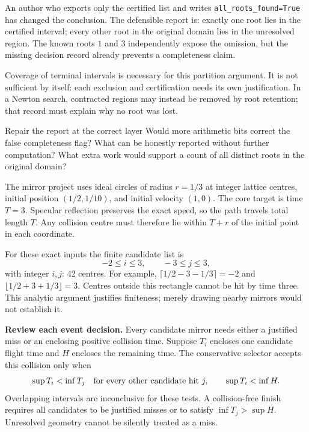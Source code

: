 An author who exports only the certified list and writes
\texttt{all\_roots\_found=True} has changed the conclusion. The defensible
report is: exactly one root lies in the certified interval; every other root
in the original domain lies in the unresolved region. The known roots $1$
and $3$ independently expose the omission, but the missing decision record
already prevents a completeness claim.

Coverage of terminal intervals is necessary for this partition argument.
It is not sufficient by itself: each exclusion and certification needs its
own justification. In a Newton search, contracted regions may instead be
removed by root retention; that record must explain why no root was lost.

\begin{question}{Repair the report at the correct layer}
Would more arithmetic bits correct the false completeness flag? What can
be honestly reported without further computation? What extra work would
support a count of all distinct roots in the original domain?
\end{question}

\newpage
{}
The mirror project uses ideal circles of radius $r=1/3$ at integer lattice
centres, initial position $(1/2,1/10)$, and initial velocity $(1,0)$.
The core target is time $T=3$. Specular reflection preserves the exact
speed, so the path travels total length $T$. Any collision centre must
therefore lie within $T+r$ of the initial point in each coordinate.

For these exact inputs the finite candidate list is
\[
                 -2\le i\le3,\qquad -3\le j\le3,
\]
with integer $i,j$: 42 centres. For example,
$\lceil1/2-3-1/3\rceil=-2$ and
$\lfloor1/2+3+1/3\rfloor=3$. Centres outside this rectangle cannot be
hit by time three. This analytic argument justifies finiteness; merely
drawing nearby mirrors would not establish it.

\textbf{Review each event decision.} Every candidate mirror needs either
a justified miss or an enclosing positive collision time. Suppose $T_i$
encloses one candidate flight time and $H$ encloses the remaining time.
The conservative selector accepts this collision only when
\[
 \sup T_i<\inf T_j\quad\hbox{for every other candidate hit }j,
 \qquad \sup T_i<\inf H.
\]
Overlapping intervals are inconclusive for these tests. A collision-free
finish requires all candidates to be justified misses or to satisfy
$\inf T_j>\sup H$. Unresolved geometry cannot be silently treated as a miss.

